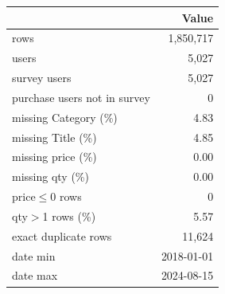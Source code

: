 \begin{tabular}{lr}
\toprule
 & Value \\
\midrule
rows & 1,850,717 \\
users & 5,027 \\
survey users & 5,027 \\
purchase users not in survey & 0 \\
missing Category (\%) & 4.83 \\
missing Title (\%) & 4.85 \\
missing price (\%) & 0.00 \\
missing qty (\%) & 0.00 \\
price$\leq$0 rows & 0 \\
qty$>$1 rows (\%) & 5.57 \\
exact duplicate rows & 11,624 \\
date min & 2018-01-01 \\
date max & 2024-08-15 \\
\bottomrule
\end{tabular}
